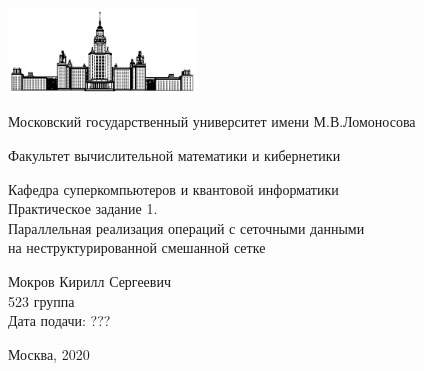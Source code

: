 \begin{titlepage}
	\begin{center}
		\includegraphics[width=50mm]{./images/MSU}

	    Московский государственный университет имени М.В.Ломоносова

	    Факультет вычислительной математики и кибернетики

	    Кафедра суперкомпьютеров и квантовой информатики\\[20mm]


	    {Практическое задание 1.\\Параллельная реализация операций с сеточными данными\\на неструктурированной смешанной сетке }\\[35mm]

	    \begin{flushright}
	            
	            Мокров Кирилл Сергеевич\\
	            523 группа\\
	            Дата подачи: ???
	            
	    \end{flushright}
	       

	    \vspace{\fill}
	    Москва, 2020
	\end{center}
\end{titlepage}

\clearpage
